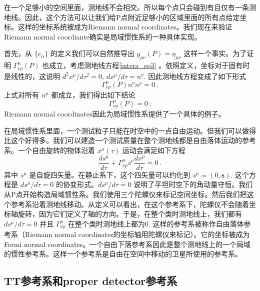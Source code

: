 在一个足够小的空间里面，测地线不会相交。所以每个点只会碰到有且仅有一条测地线。因此，这个方法可以让我们给P点附近足够小的区域里面的所有点给定坐标。这样的坐标系统被成为Riemann normal coordinates。我们现在来验证Riemann normal coordiante确实是局域惯性系的一种具体实现。

首先，从 $\{e_{\alpha}\}$ 的定义我们可以自然推导出 $g_{\mu\nu}(P) = \eta_{\mu\nu}$ 这样一个事实。为了证明 $\Gamma^\mu_{\nu\rho}(P)$ 也成立，考虑测地线方程\autoref{intera_eq3} 。依照定义，坐标对于固有时是线性的，这说明 $d^2 x^\mu/d \tau^2 = 0$, $dx^\mu/d\tau = n^\nu$. 因此测地线方程变成了如下形式
\begin{equation}
\Gamma^\mu_{\nu\rho} (P) n^\nu n^\rho = 0 ~.
\end{equation}
上式对所有 $n^\mu$ 都成立，我们得出如下结论
\begin{equation}
\Gamma^\mu_{\nu\rho} (P) = 0~.
\end{equation}
Riemann normal coordinates因此为局域惯性系提供了一个具体的例子。

在局域惯性系里面，一个测试粒子只能在时空中的一点自由运动。但我们可以做得比这个好得多。我们可以建造一个测试质量在整个测地线都是自由落体运动的参考系。一个自由旋转的物体沿着 $x^\mu(\tau)$ 运动会满足如下方程
\begin{equation}
\frac{ds^\mu}{d\tau} + \Gamma^\mu_{\nu\rho} s^\nu \frac{dx^\rho}{d\tau} = 0~.
\end{equation}
其中 $s^\mu$ 是自旋四矢量。在静止系下，这个四矢量可以约化到 $s^\mu = (0,\mathbf s)$. 这个方程是 $ds^\mu/d\tau=0$ 的协变形式。$ds^\mu/d\tau=0$ 说明了平坦时空下的角动量守恒。我们从P点开始构造局域惯性系。我们使用三个陀螺仪来标记空间坐标。然后我们把这个参考系沿着测地线移动。从定义可以看出，在这个参考系下，陀螺仪不会随着坐标轴旋转，因为它们定义了轴的方向。于是，在整个类时测地线上，我们都有 $ds^\mu/d\tau = 0$ 并且 $\Gamma^\mu_{\nu\rho}$ 在整个类时测地线上都为0. 这样的参考系被称作自由落体参考系（Riemann normal coordinates的坐标轴用陀螺仪来标记）。它的坐标被成为Fermi normal coordinates。一个自由下落参考系因此是整个测地线上的一个局域的惯性参考系。这样一个参考系是自由在空间中移动的卫星所使用的参考系。

\subsection{TT参考系和proper detector参考系}
